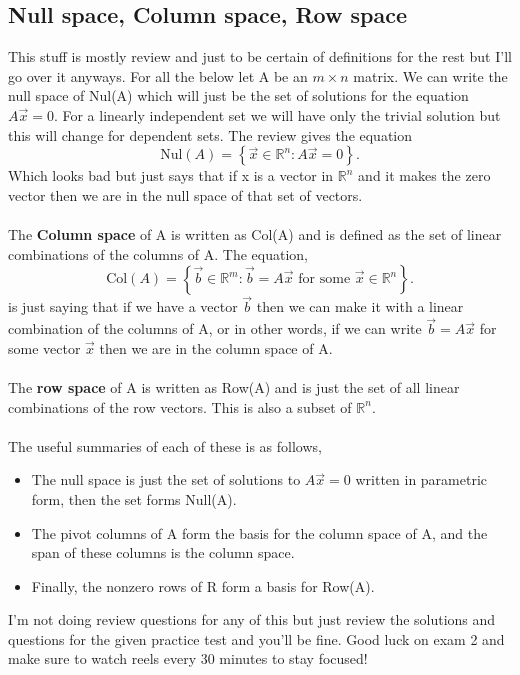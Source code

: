 \documentclass{report}
\begin{document}
\begin{multicols}{2}
\section{Null space, Column space, Row space}%
\label{sec: Null space, Column space, Row space }
This stuff is mostly review and just to be certain of definitions for the rest but I'll go over it anyways. For all the below let A be an $ m \times n $ matrix. We can write the null space of Nul(A) which will just be the set of solutions for the equation $ A \vec{ x }= 0 $. For a linearly independent set we will have only the trivial solution but this will change for dependent sets. The review gives the equation
\[
\text{Nul}( A ) = \left\{ \vec{ x } \in \mathbb{ R }^{ n } : A \vec{ x } = 0 \right\}
.\] 
Which looks bad but just says that if x is a vector in $ \mathbb{R}^{ n } $ and it makes the zero vector then we are in the null space of that set of vectors. \\\\
The \textbf{Column space} of A is written as Col(A) and is defined as the set of linear combinations of the columns of A. The equation,
\[
\text{Col}( A ) = \left\{ \vec{ b } \in \mathbb{ R }^{ m } : \vec{ b } = A \vec{ x } \text{ for some } \vec{ x } \in \mathbb{ R }^{ n } \right\}
.\] 
is just saying that if we have a vector $ \vec{ b } $ then we can make it with a linear combination of the columns of A, or in other words, if we can write $ \vec{ b } = A \vec{ x } $ for some vector $ \vec{ x } $ then we are in the column space of A. \\\\
The \textbf{row space} of A is written as Row(A) and is just the set of all linear combinations of the row vectors. This is also a subset of $ \mathbb{R}^{ n } $. \\\\
The useful summaries of each of these is as follows,
\begin{itemize}
	\item The null space is just the set of solutions to $ A \vec{ x } = 0 $ written in parametric form, then the set forms Null(A).
	\item The pivot columns of A form the basis for the column space of A, and the span of these columns is the column space.
	\item Finally, the nonzero rows of R form a basis for Row(A). 
\end{itemize}
I'm not doing review questions for any of this but just review the solutions and questions for the given practice test and you'll be fine. Good luck on exam 2 and make sure to watch reels every 30 minutes to stay focused!
\end{multicols}
\end{document}
